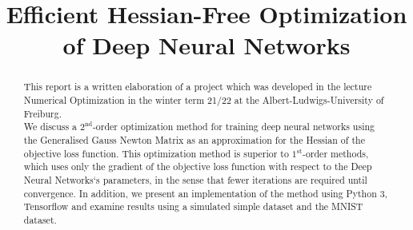 \documentclass[conference]{IEEEtran}
\begin{document}
\title{Efficient Hessian-Free Optimization of Deep Neural Networks
}

\author{
\and
{}
\and
{}
}

\maketitle

\begin{abstract}
This report is a written elaboration of a project which was developed in the lecture Numerical Optimization in the winter term 21/22 at the Albert-Ludwigs-University of Freiburg.\\
We discuss a $2^{\text{nd}}$-order optimization method for training deep neural networks using the Generalised Gauss Newton Matrix as an approximation for the Hessian of the objective loss function. This optimization method is superior to $1^{\text{st}}$-order methods, which uses only the gradient of the objective loss function with respect to the Deep Neural Networks`s parameters, in the sense that fewer iterations are required until convergence. In addition, we present an implementation of the method using Python 3, Tensorflow and examine results using a simulated simple dataset and the MNIST dataset.
\end{abstract}
\end{document}
